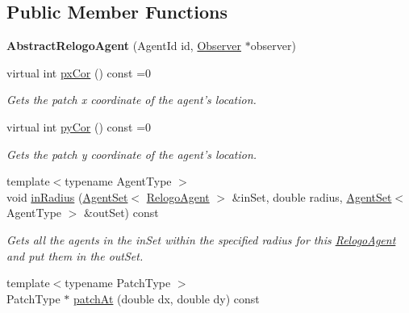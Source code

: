 \subsection*{Public Member Functions}
\begin{DoxyCompactItemize}
\item 
\hypertarget{classrepast_1_1relogo_1_1_abstract_relogo_agent_a91a3e14db2e9b51270faf04cc24c6763}{{\bfseries Abstract\-Relogo\-Agent} (Agent\-Id id, \hyperlink{classrepast_1_1relogo_1_1_observer}{Observer} $\ast$observer)}\label{classrepast_1_1relogo_1_1_abstract_relogo_agent_a91a3e14db2e9b51270faf04cc24c6763}

\item 
virtual int \hyperlink{classrepast_1_1relogo_1_1_abstract_relogo_agent_ae631f45eba5815470dea5a2059213c1b}{px\-Cor} () const =0
\begin{DoxyCompactList}\small\item\em Gets the patch x coordinate of the agent's location. \end{DoxyCompactList}\item 
virtual int \hyperlink{classrepast_1_1relogo_1_1_abstract_relogo_agent_a38df42fbb6277fa62d0068fbd37e6595}{py\-Cor} () const =0
\begin{DoxyCompactList}\small\item\em Gets the patch y coordinate of the agent's location. \end{DoxyCompactList}\item 
{\footnotesize template$<$typename Agent\-Type $>$ }\\void \hyperlink{classrepast_1_1relogo_1_1_abstract_relogo_agent_aa166d2f1f0bd15ff4bf66afbc2575e6e}{in\-Radius} (\hyperlink{classrepast_1_1relogo_1_1_agent_set}{Agent\-Set}$<$ \hyperlink{classrepast_1_1relogo_1_1_relogo_agent}{Relogo\-Agent} $>$ \&in\-Set, double radius, \hyperlink{classrepast_1_1relogo_1_1_agent_set}{Agent\-Set}$<$ Agent\-Type $>$ \&out\-Set) const 
\begin{DoxyCompactList}\small\item\em Gets all the agents in the in\-Set within the specified radius for this \hyperlink{classrepast_1_1relogo_1_1_relogo_agent}{Relogo\-Agent} and put them in the out\-Set. \end{DoxyCompactList}\item 
{\footnotesize template$<$typename Patch\-Type $>$ }\\Patch\-Type $\ast$ \hyperlink{classrepast_1_1relogo_1_1_abstract_relogo_agent_abf11a5acb9ae1c549b4800abd8d2e2c9}{patch\-At} (double dx, double dy) const 

\end{DoxyCompactItemize}
